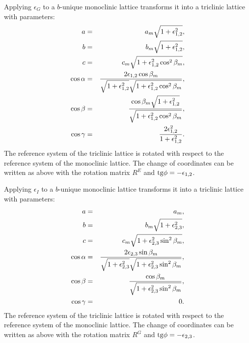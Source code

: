\documentclass[12pt,a4paper,twoside]{report}
\begin{document}
Applying $\epsilon_G$ to a $b$-unique monoclinic lattice transforms
it into a triclinic lattice with parameters:
\begin{eqnarray}
a&=&a_m \sqrt{1+\epsilon_{1,2}^2}, \\
b&=&b_m \sqrt{1+\epsilon_{1,2}^2}, \\
c&=&c_m \sqrt{1+\epsilon_{1,2}^2 \cos^2\beta_m}, \\
\cos\alpha &=& {2 \epsilon_{1,2} \cos\beta_m \over 
\sqrt{1+\epsilon_{1,2}^2} \sqrt{1+\epsilon_{1,2}^2 \cos^2\beta_m}}, \\
\cos\beta &=& {\cos\beta_m \sqrt{1+\epsilon_{1,2}^2} \over
\sqrt{1+\epsilon_{1,2}^2 \cos^2\beta_m}}, \\
\cos\gamma &=& {2 \epsilon_{1,2}^2 \over 1+\epsilon_{1,2}^2}.
\end{eqnarray}
The reference system of the triclinic lattice is rotated 
with respect to the reference system of the  
monoclinic lattice. 
The change of coordinates can be written as above with the rotation matrix 
$R^E$ and ${\rm tg}\phi=-\epsilon_{1,2}$.

Applying $\epsilon_I$ to a $b$-unique monoclinic lattice transforms
it into a triclinic lattice with parameters:
\begin{eqnarray}
a&=&a_m,  \\
b&=&b_m \sqrt{1+\epsilon_{2,3}^2}, \\
c&=&c_m \sqrt{1+\epsilon_{2,3}^2 \sin^2\beta_m}, \\
\cos\alpha &=& {2 \epsilon_{2,3} \sin\beta_m \over 
\sqrt{1+\epsilon_{2,3}^2} \sqrt{1+\epsilon_{2,3}^2 \sin^2\beta_m}}, \\
\cos\beta &=& { \cos\beta_m  \over
\sqrt{1+\epsilon_{2,3}^2 \sin^2\beta_m}}, \\
\cos\gamma &=& 0. 
\end{eqnarray}
The reference system of the triclinic lattice is rotated 
with respect to the reference system of the  
monoclinic lattice.
The change of coordinates can be written as above with the rotation matrix 
$R^G$ and ${\rm tg}\phi=-\epsilon_{2,3}$.
\end{document}
